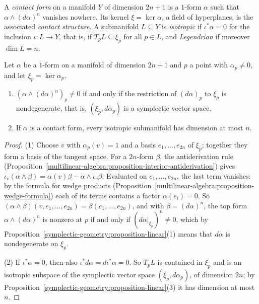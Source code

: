 \begin{definition}\label{symplectic-geometry:definition-contact}
A \emph{contact form} on a manifold $Y$ of dimension $2n + 1$ is a $1$-form $\alpha$ such that $\alpha \wedge (d\alpha)^n$ vanishes nowhere. Its kernel $\xi = \ker\alpha$, a field of hyperplanes, is the
associated \emph{contact structure}. A submanifold $L \subseteq Y$ is \emph{isotropic} if $\iota^*\alpha = 0$ for the inclusion $\iota \colon L \to Y$, that is, if $T_pL \subseteq \xi_p$ for all $p \in L$, and
\emph{Legendrian} if moreover $\dim L = n$.
\end{definition}

\begin{lemma}\label{symplectic-geometry:lemma-contact}
Let $\alpha$ be a $1$-form on a manifold of dimension $2n + 1$ and $p$ a point with $\alpha_p \neq 0$, and let $\xi_p = \ker\alpha_p$.
\begin{enumerate}
\item $(\alpha \wedge (d\alpha)^n)_p \neq 0$ if and only if the restriction of $(d\alpha)_p$ to $\xi_p$ is nondegenerate, that is, $(\xi_p, d\alpha_p)$ is a symplectic vector space.
\item If $\alpha$ is a contact form, every isotropic submanifold has dimension at most $n$.
\end{enumerate}
\end{lemma}

\begin{proof}
(1) Choose $v$ with $\alpha_p(v) = 1$ and a basis $e_1, \ldots, e_{2n}$ of $\xi_p$; together they form a basis of the tangent space. For a $2n$-form $\beta$, the antiderivation rule
(Proposition~\ref{multilinear-algebra:proposition-interior-antiderivation}) gives $\iota_v(\alpha \wedge \beta) = \alpha(v)\beta - \alpha \wedge \iota_v\beta$. Evaluated on $e_1, \ldots, e_{2n}$, the last term vanishes: by
the formula for wedge products (Proposition~\ref{multilinear-algebra:proposition-wedge-formula}) each of its terms contains a factor $\alpha(e_i) = 0$. So
$(\alpha \wedge \beta)(v, e_1, \ldots, e_{2n}) = \beta(e_1, \ldots, e_{2n})$, and with $\beta = (d\alpha)^n$, the top form $\alpha \wedge (d\alpha)^n$ is nonzero at $p$ if and only if $(d\alpha|_{\xi_p})^n \neq 0$, which
by Proposition~\ref{symplectic-geometry:proposition-linear}(1) means that $d\alpha$ is nondegenerate on $\xi_p$.

(2) If $\iota^*\alpha = 0$, then also $\iota^*d\alpha = d\iota^*\alpha = 0$. So $T_pL$ is contained in $\xi_p$ and is an isotropic subspace of the symplectic vector space $(\xi_p, d\alpha_p)$, of dimension $2n$; by
Proposition~\ref{symplectic-geometry:proposition-linear}(3) it has dimension at most $n$.
\end{proof}

